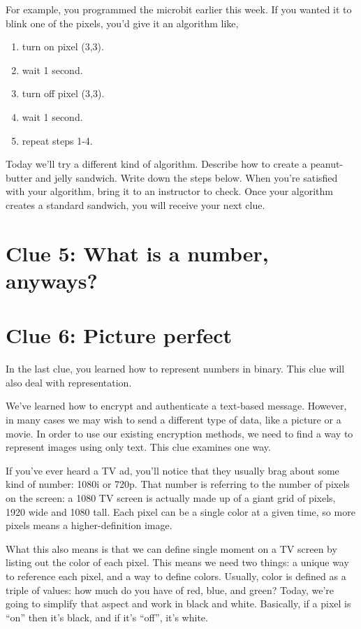 \documentclass{article}
\begin{document}
For example, you programmed the microbit earlier this week. If you wanted it to blink one of the pixels, you'd give it an algorithm like,

\begin{enumerate}[noitemsep]
  \item turn on pixel (3,3).
  \item wait 1 second.
  \item turn off pixel (3,3).
  \item wait 1 second.
  \item repeat steps 1-4.
\end{enumerate}

Today we'll try a different kind of algorithm. Describe how to create a peanut-butter and jelly sandwich. Write down the steps below. When you're satisfied with your algorithm, bring it to an instructor to check. Once your algorithm creates a standard sandwich, you will receive your next clue.

\newpage

\section*{Clue 5: What is a number, anyways?}


\newpage

\section*{Clue 6: Picture perfect}
In the last clue, you learned how to represent numbers in binary. This clue will also deal with representation.

We've learned how to encrypt and authenticate a text-based message. However, in many cases we may wish to send a different type of data, like a picture or a movie. In order to use our existing encryption methods, we need to find a way to represent images using only text. This clue examines one way.

If you've ever heard a TV ad, you'll notice that they usually brag about some kind of number: 1080i or 720p. That number is referring to the number of pixels on the screen: a 1080 TV screen is actually made up of a giant grid of pixels, 1920 wide and 1080 tall. Each pixel can be a single color at a given time, so more pixels means a higher-definition image.

What this also means is that we can define single moment on a TV screen by listing out the color of each pixel. This means we need two things: a unique way to reference each pixel, and a way to define colors. Usually, color is defined as a triple of values: how much do you have of red, blue, and green? Today, we're going to simplify that aspect and work in black and white. Basically, if a pixel is  ``on'' then it's black, and if it's ``off'', it's white. 
\end{document}
